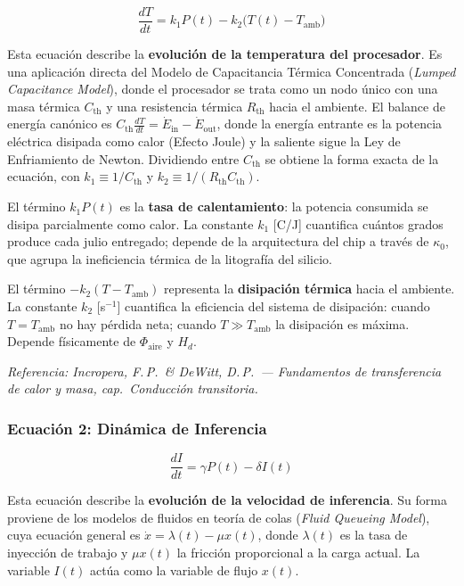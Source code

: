 \documentclass[10pt, twocolumn]{article}
\begin{document}
\begin{equation}
  \frac{dT}{dt} = k_1 P(t) - k_2 \bigl(T(t) - T_{\text{amb}}\bigr)
  \label{eq:termica}
\end{equation}

Esta ecuación describe la \textbf{evolución de la temperatura del procesador}.
Es una aplicación directa del Modelo de Capacitancia Térmica Concentrada
(\emph{Lumped Capacitance Model}), donde el procesador se trata como un nodo único
con una masa térmica $C_{\text{th}}$ y una resistencia térmica $R_{\text{th}}$
hacia el ambiente. El balance de energía canónico es
$C_{\text{th}} \frac{dT}{dt} = \dot{E}_{\text{in}} - \dot{E}_{\text{out}}$,
donde la energía entrante es la potencia eléctrica disipada como calor (Efecto
Joule) y la saliente sigue la Ley de Enfriamiento de Newton. Dividiendo entre
$C_{\text{th}}$ se obtiene la forma exacta de la ecuación, con
$k_1 \equiv 1/C_{\text{th}}$ y $k_2 \equiv 1/(R_{\text{th}} C_{\text{th}})$.

El término $k_1 P(t)$ es la \textbf{tasa de calentamiento}: la potencia consumida
se disipa parcialmente como calor. La constante $k_1$ [\textdegree C/J] cuantifica
cuántos grados produce cada julio entregado; depende de la arquitectura del chip
a través de $\kappa_0$, que agrupa la ineficiencia térmica de la litografía del
silicio.

El término $-k_2(T - T_{\text{amb}})$ representa la \textbf{disipación térmica}
hacia el ambiente. La constante $k_2$ [s$^{-1}$] cuantifica la eficiencia del
sistema de disipación: cuando $T = T_{\text{amb}}$ no hay pérdida neta; cuando
$T \gg T_{\text{amb}}$ la disipación es máxima. Depende físicamente de
$\Phi_{\text{aire}}$ y $H_d$.

\smallskip
\noindent\textit{Referencia: Incropera, F.\,P.\ \& DeWitt, D.\,P.\ ---
\emph{Fundamentos de transferencia de calor y masa}, cap.\ Conducción transitoria.}

\subsubsection*{Ecuación 2: Dinámica de Inferencia}

\begin{equation}
  \frac{dI}{dt} = \gamma P(t) - \delta I(t)
  \label{eq:inferencia}
\end{equation}

Esta ecuación describe la \textbf{evolución de la velocidad de inferencia}.
Su forma proviene de los modelos de fluidos en teoría de colas
(\emph{Fluid Queueing Model}), cuya ecuación general es
$\dot{x} = \lambda(t) - \mu x(t)$, donde $\lambda(t)$ es la tasa de inyección
de trabajo y $\mu x(t)$ la fricción proporcional a la carga actual. La variable
$I(t)$ actúa como la variable de flujo $x(t)$.
\end{document}
